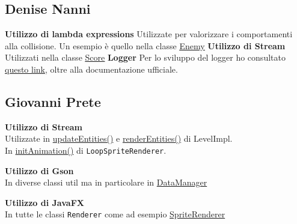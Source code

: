 \documentclass[a4paper,12pt]{report}
\begin{document}
\subsection{Denise Nanni}
\textbf{Utilizzo di lambda expressions}
\newline
Utilizzate per valorizzare i comportamenti alla collisione. Un esempio è quello nella classe
\href{https://github.com/dennnanni/UNIBOssfight/blob/61e1d141f734d2205d4e8b65fed0ebfc668a8357/UNIBOSSfight/src/main/java/app/core/entity/Enemy.java#L34}{\underline{Enemy}}
\newline
\textbf{Utilizzo di Stream}
\newline
Utilizzati nella classe \href{https://github.com/dennnanni/UNIBOssfight/blob/61e1d141f734d2205d4e8b65fed0ebfc668a8357/UNIBOSSfight/src/main/java/app/game/Score.java#L60}{\underline{Score}}
\newline
\textbf{Logger}
\newline
Per lo sviluppo del logger ho consultato \href{https://www.digitalocean. com/community/tutorials/logger-in-java-logging-example}{\underline{questo link}}, oltre alla documentazione ufficiale.

\subsection{Giovanni Prete}
\textbf{Utilizzo di Stream}\\
Utilizzate in \href{https://github.com/dennnanni/UNIBOssfight/blob/0768464f3f7be0d1f35435f89616902091c0b7a8/UNIBOSSfight/src/main/java/app/impl/level/LevelImpl.java#L72}{updateEntities()} e \href{https://github.com/dennnanni/UNIBOssfight/blob/0768464f3f7be0d1f35435f89616902091c0b7a8/UNIBOSSfight/src/main/java/app/impl/level/LevelImpl.java#L125}{renderEntities()} di LevelImpl.\\
In \href{https://github.com/dennnanni/UNIBOssfight/blob/0b788e3202136a52ea940d4dedaac28589c7eb66/UNIBOSSfight/src/main/java/app/impl/component/LoopSpriteRenderer.java#L76}{initAnimation()} di \texttt{LoopSpriteRenderer}.

\textbf{Utilizzo di Gson}\\
In diverse classi util ma in particolare in \href{https://github.com/dennnanni/UNIBOssfight/blob/0b788e3202136a52ea940d4dedaac28589c7eb66/UNIBOSSfight/src/main/java/app/util/DataManager.java}{DataManager}

\textbf{Utilizzo di JavaFX}\\
In tutte le classi \texttt{Renderer} come ad esempio \href{https://github.com/dennnanni/UNIBOssfight/blob/0b788e3202136a52ea940d4dedaac28589c7eb66/UNIBOSSfight/src/main/java/app/impl/component/SpriteRenderer.java#L55}{SpriteRenderer}\\
\end{document}
